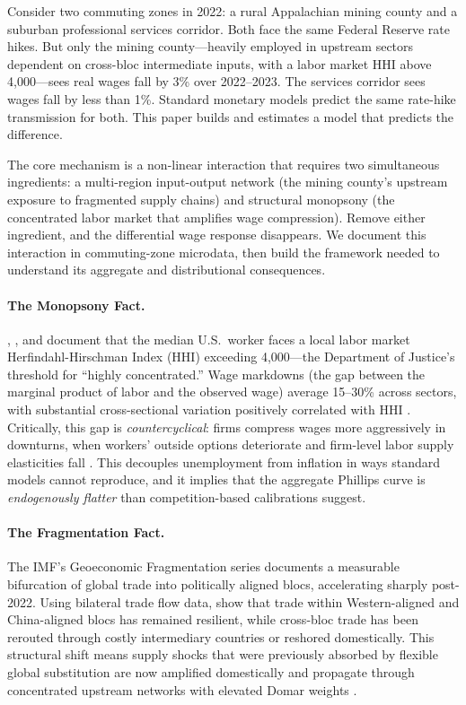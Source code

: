 Consider two commuting zones in 2022: a rural Appalachian mining county and a
suburban professional services corridor. Both face the same Federal Reserve
rate hikes. But only the mining county---heavily employed in upstream sectors
dependent on cross-bloc intermediate inputs, with a labor market HHI above
4{,}000---sees real wages fall by 3\% over 2022--2023. The services corridor
sees wages fall by less than 1\%. Standard monetary models predict the same
rate-hike transmission for both. This paper builds and estimates a model that
predicts the difference.

The core mechanism is a non-linear interaction that requires two simultaneous
ingredients: a multi-region input-output network (the mining county's upstream
exposure to fragmented supply chains) and structural monopsony (the concentrated
labor market that amplifies wage compression). Remove either ingredient, and the
differential wage response disappears. We document this interaction in
commuting-zone microdata, then build the framework needed to understand its
aggregate and distributional consequences.

\paragraph{The Monopsony Fact.}
\citet{azar2022labor}, \citet{rinz2022labor}, and \citet{benmelech2022}
document that the median U.S.\ worker faces a local labor market
Herfindahl-Hirschman Index (HHI) exceeding 4{,}000---the Department of
Justice's threshold for ``highly concentrated.'' Wage markdowns (the gap
between the marginal product of labor and the observed wage) average 15--30\%
across sectors, with substantial cross-sectional variation positively
correlated with HHI \citep{azar2022labor}. Critically, this gap is
\emph{countercyclical}: firms compress wages more aggressively in downturns,
when workers' outside options deteriorate and firm-level labor supply
elasticities fall \citep{dube2020monopsony, manning2021monopsony}. This
decouples unemployment from inflation in ways standard models cannot reproduce,
and it implies that the aggregate Phillips curve is \emph{endogenously
flatter} than competition-based calibrations suggest.

\paragraph{The Fragmentation Fact.}
The IMF's Geoeconomic Fragmentation series \citep{aiyar2023} documents a
measurable bifurcation of global trade into politically aligned blocs,
accelerating sharply post-2022. Using bilateral trade flow data, \citet{gopinath2024}
show that trade within Western-aligned and China-aligned blocs has remained
resilient, while cross-bloc trade has been rerouted through costly
intermediary countries or reshored domestically. This structural shift means
supply shocks that were previously absorbed by flexible global substitution
are now amplified domestically and propagate through concentrated upstream
networks with elevated Domar weights \citep{baqaee2019}.

